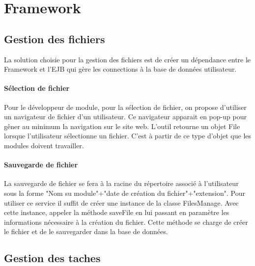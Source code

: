 \section{Framework}

\subsection{Gestion des fichiers}

La solution choisie pour la gestion des fichiers est de créer un dépendance entre le Framework et l'EJB qui gère les connections à la base de données utilisateur.\\

\paragraph*{Sélection de fichier}

Pour le développeur de module, pour la sélection de fichier, on propose d'utiliser un navigateur de fichier d'un utilisateur. Ce navigateur apparait en pop-up pour gêner au minimum la navigation sur le site web. L'outil retourne un objet File lorsque l'utilisateur sélectionne un fichier. C'est à partir de ce type d'objet que les modules doivent travailler.\\

\paragraph*{Sauvegarde de fichier}

La sauvegarde de fichier se fera à la racine du répertoire associé à l'utilisateur sous la forme "Nom su module"+"date de création du fichier"+"extension". Pour utiliser ce service il suffit de créer une instance de la classe FilesManage. Avec cette instance, appeler la méthode saveFile en lui passant en paramètre les informations nécessaire à la création du fichier. Cette méthode se charge de créer le fichier et de le sauvegarder dans la base de données.

\subsection{Gestion des taches}